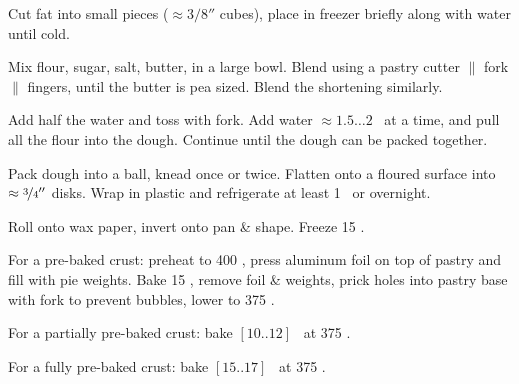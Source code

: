 \begin{preparation}
\item Cut fat into small pieces ($\approx 3/8''$ cubes), place in freezer briefly along with water until cold.

\item Mix flour, sugar, salt, butter, in a large bowl.
	Blend using a pastry cutter $\|$ fork $\|$ fingers, until the butter is pea sized.
	Blend the shortening similarly.

\item Add half the water and toss with fork.
	Add water $\approx 1.5 \dots 2$ \Tablespoon~at a time, and pull all the flour into the dough.
	Continue until the dough can be packed together.

\item Pack dough into a ball, knead once or twice.
	Flatten onto a floured surface into $\approx \nicefrac{3}{4}''$ disks.
	Wrap in plastic and refrigerate at least 1 \hour~or overnight.

\item Roll onto wax paper, invert onto pan \& shape.
	Freeze 15 \minute.

\item For a pre-baked crust: preheat to 400 \Fahrenheit, press aluminum foil on top of pastry and fill with pie weights.
	Bake 15 \minute, remove foil \& weights, prick holes into pastry base with fork to prevent bubbles, lower to 375 \Fahrenheit.

\item For a partially pre-baked crust: bake $[10..12]$ \minute~at 375 \Fahrenheit.

\item For a fully pre-baked crust: bake $[15..17]$ \minute~at 375 \Fahrenheit.
\end{preparation}


\recipeend%
